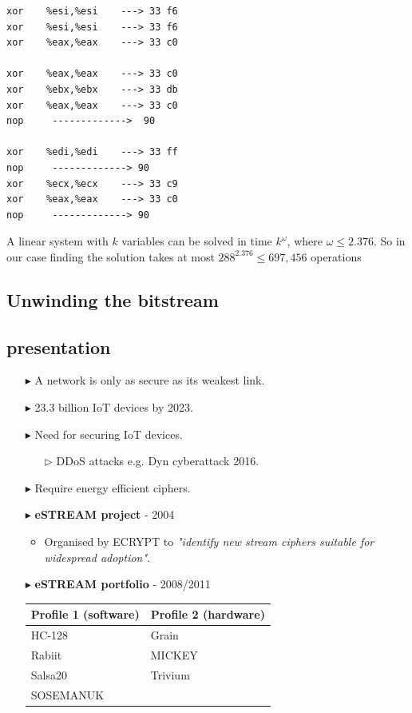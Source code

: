\documentclass[conference]{IEEEtran}
\begin{document}
\begin{lstlisting}[style=asm]
xor    %esi,%esi    ---> 33 f6
xor    %esi,%esi    ---> 33 f6
xor    %eax,%eax    ---> 33 c0

xor    %eax,%eax    ---> 33 c0
xor    %ebx,%ebx    ---> 33 db 
xor    %eax,%eax    ---> 33 c0
nop     ------------->  90

xor    %edi,%edi    ---> 33 ff
nop     -------------> 90
xor    %ecx,%ecx    ---> 33 c9
xor    %eax,%eax    ---> 33 c0
nop     -------------> 90
\end{lstlisting}


A linear system with $k$ variables can be solved in time $k^\omega$, where $\omega \leq 2.376$.
So in our case finding the solution takes at most $288^{2.376} \leq 697,456$ operations


\subsection{Unwinding the bitstream}







\subsection{presentation}


\begin{itemize}
\item[$\blacktriangleright$] A network is only as secure as its weakest link.
\item[$\blacktriangleright$] 23.3 billion IoT devices by 2023.
\item[$\blacktriangleright$] Need for securing IoT devices.
\begin{itemize}[itemsep=0.25cm]
\item[$\triangleright$] DDoS attacks e.g. Dyn cyberattack 2016.
\end{itemize}
\item[$\blacktriangleright$] Require energy efficient ciphers.
\end{itemize}

\begin{itemize}
\item[$\blacktriangleright$] \textbf{eSTREAM project} - 2004
\begin{itemize}
\item Organised by ECRYPT to \textit{"identify new stream ciphers suitable for widespread adoption"}.
\end{itemize}
\item[$\blacktriangleright$] \textbf{eSTREAM portfolio} - 2008/2011
\begin{table}
\centering
\begin{tabular}{l|l}
Profile 1 (software) & Profile 2 (hardware)\\\hline
HC-128 & Grain\\
Rabiit & MICKEY\\
Salsa20 & Trivium\\
SOSEMANUK &
\end{tabular}
\end{table}
\end{itemize}
\end{document}
